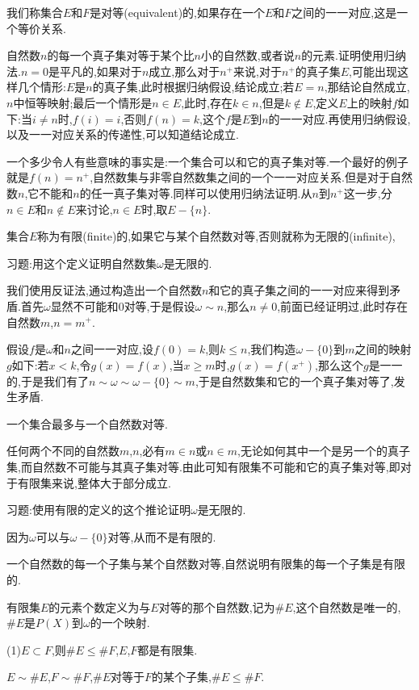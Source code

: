 \documentclass[12pt,a4paper,openany]{book}
\begin{document}
我们称集合$E$和$F$是对等(equivalent)的,如果存在一个$E$和$F$之间的一一对应,这是一个等价关系.

自然数$n$的每一个真子集对等于某个比$n$小的自然数,或者说$n$的元素.证明使用归纳法.$n=0$是平凡的,如果对于$n$成立,那么对于$n^+$来说,对于$n^+$的真子集$E$,可能出现这样几个情形:$E$是$n$的真子集,此时根据归纳假设,结论成立;若$E=n$,那结论自然成立,$n$中恒等映射;最后一个情形是$n \in E$,此时,存在$k \in n$,但是$k \notin E$,定义$E$上的映射$f$如下:当$i \neq n$时,$f(i)=i$,否则$f(n)=k$,这个$f$是$E$到$n$的一一对应.再使用归纳假设,以及一一对应关系的传递性,可以知道结论成立.

一个多少令人有些意味的事实是:一个集合可以和它的真子集对等.一个最好的例子就是$f(n)=n^+$,自然数集与非零自然数集之间的一个一一对应关系.但是对于自然数$n$,它不能和$n$的任一真子集对等.同样可以使用归纳法证明.从$n$到$n^+$这一步,分$n \in E$和$n \notin E$来讨论,$n \in E$时,取$E-\{n\}$.

集合$E$称为有限(finite)的,如果它与某个自然数对等,否则就称为无限的(infinite),

习题:用这个定义证明自然数集$\omega$是无限的.

我们使用反证法,通过构造出一个自然数$n$和它的真子集之间的一一对应来得到矛盾.首先$\omega$显然不可能和$0$对等,于是假设$\omega \sim n$,那么$n \neq 0$,前面已经证明过,此时存在自然数$m$,$n=m^+$.

假设$f$是$\omega$和$n$之间一一对应,设$f(0)=k$,则$k \le n$,我们构造$\omega-\{0\}$到$m$之间的映射$g$如下:若$x<k$,令$g(x)=f(x)$,当$x \ge m$时,$g(x)=f(x^+)$,那么这个$g$是一一的,于是我们有了$n \sim \omega \sim \omega-\{0\} \sim m$,于是自然数集和它的一个真子集对等了,发生矛盾.

一个集合最多与一个自然数对等.

任何两个不同的自然数$m$,$n$,必有$m \in n$或$n \in m$,无论如何其中一个是另一个的真子集,而自然数不可能与其真子集对等.由此可知有限集不可能和它的真子集对等,即对于有限集来说,整体大于部分成立.

习题:使用有限的定义的这个推论证明$\omega$是无限的.

因为$\omega$可以与$\omega-\{0\}$对等,从而不是有限的.

一个自然数的每一个子集与某个自然数对等,自然说明有限集的每一个子集是有限的.

有限集$E$的元素个数定义为与$E$对等的那个自然数,记为$\#E$,这个自然数是唯一的,$\#E$是$P(X)$到$\omega$的一个映射.

(1)$E \subset F$,则$\#E \le \#F$,$E$,$F$都是有限集.

$E \sim \#E$,$F \sim \#F$,$\#E$对等于$F$的某个子集,$\#E \le \#F$.
\end{document}
